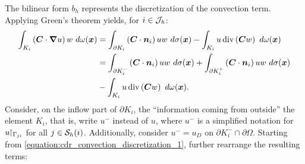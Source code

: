 The bilinear form $b_h$ represents the discretization of the convection term. Applying Green's theorem yields, for $i \in \mathcal{J}_h$:
\begin{align}
    \int_{K_i} \left( \bm{C} \cdot \bm{\nabla} u \right) w ~ d \omega(\bm{x}) &= \int_{\partial K_i} \left( \bm{C} \cdot \bm{n}_i \right) u w ~ d \sigma(\bm{x}) - \int_{K_i} u \operatorname*{div} \left( \bm{C} w \right) ~ d \omega(\bm{x}) \notag \\
    &= \int_{\partial K_i^-} \left( \bm{C} \cdot \bm{n}_i \right) u w ~ d \sigma(\bm{x}) + \int_{\partial K_i^+} \left( \bm{C} \cdot \bm{n}_i \right) u w ~ d \sigma(\bm{x}) \label{equation:cdr_convection_discretization_1} \\
    & - \int_{K_i} u \operatorname*{div} \left( \bm{C} w \right) ~ d \omega(\bm{x}). \notag
\end{align}
Consider, on the inflow part of $\partial K_i$, the ``information coming from outside'' the element $K_i$, that is, write $u^-$ instead of $u$, where $u^-$ is a simplified notation for $u \!\!\restriction_{\Gamma_{ji}}$ for all $j \in \mathcal{S}_h(i)$. Additionally, consider $u^- = u_D$ on $\partial K_i^- \cap \partial \Omega$. Starting from \cref{equation:cdr_convection_discretization_1}, further rearrange the resulting terms:
